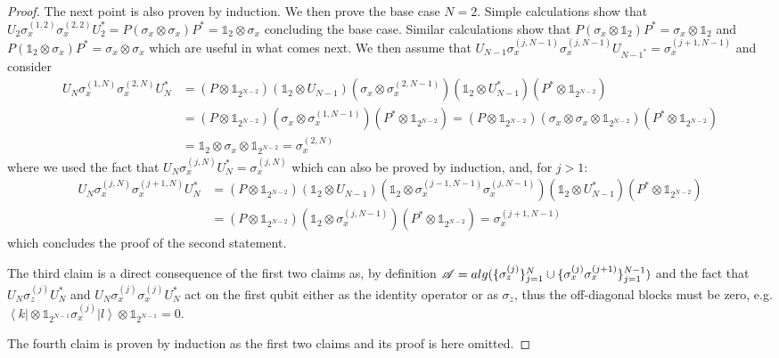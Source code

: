 \documentclass[aihp,12pt]{imsart}
\newcommand{\As}{\mathscr{A}}
\newcommand{\one}{\mathbb{1}}
\newcommand{\alg}{{\rm alg}}
\newcommand{\ket}[1]{\left| #1 \right>}
\newcommand{\bra}[1]{\left< #1 \right|}
\theoremstyle{theorem}
\theoremstyle{definition}
\theoremstyle{remark}
\begin{document}
\begin{proof}
    The next point is also proven by induction. 
    We then prove the base case $N=2$. Simple calculations show that \(U_2\sigma_x^{(1,2)}\sigma_x^{(2,2)} U_2^* = P (\sigma_x\otimes\sigma_x) P^* = \one_2\otimes\sigma_x\) concluding the base case. Similar calculations show that \(P(\sigma_x\otimes\one_2)P^* = \sigma_x\otimes \one_2 \) and \(P(\one_2\otimes\sigma_x)P^* = \sigma_x\otimes \sigma_x \) which are useful in what comes next. We then assume that $U_{N-1} \sigma_x^{(j,N-1)}\sigma_x^{(j,N-1)} U_{N-1^*} = \sigma_x^{(j+1,N-1)}$ and consider
    \begin{align*}
        U_N \sigma_x^{(1,N)}\sigma_x^{(2,N)}U_N^* &= (P\otimes\one_{2^{N-2}})(\one_2\otimes U_{N-1}) (\sigma_x\otimes \sigma_x^{(2,N-1)}) (\one_2\otimes U_{N-1}^*) (P^*\otimes\one_{2^{N-2}})\\
        &= (P\otimes\one_{2^{N-2}}) (\sigma_x\otimes \sigma_x^{(1,N-1)}) (P^*\otimes\one_{2^{N-2}}) = (P\otimes\one_{2^{N-2}}) (\sigma_x\otimes \sigma_x \otimes \one_{2^{N-2}} ) (P^*\otimes\one_{2^{N-2}}) \\&= \one_2\otimes\sigma_x\otimes \one_{2^{N-2}} = \sigma_x^{(2,N)}
    \end{align*}
    where we used the fact that $U_N\sigma_x^{(j,N)}U_N^* = \sigma_x^{(j,N)}$ which can also be proved by induction, and, for $j>1$:
    \begin{align*}
        U_N \sigma_x^{(j,N)}\sigma_x^{(j+1,N)}U_N^* &= (P\otimes\one_{2^{N-2}})(\one_2\otimes U_{N-1}) (\one_2\otimes \sigma_x^{(j-1,N-1)}\sigma_x^{(j,N-1)}) (\one_2\otimes U_{N-1}^*) (P^*\otimes\one_{2^{N-2}})\\
        &= (P\otimes\one_{2^{N-2}})(\one_2\otimes \sigma_x^{(j,N-1)}) (P^*\otimes\one_{2^{N-2}}) = \sigma_x^{(j+1,N-1)}
    \end{align*}
    which concludes the proof of the second statement. 

    The third claim is a direct consequence of the first two claims as, by definition $\As = \alg(\{\sigma_z^{(j)}\}_{j=1}^N\cup\{\sigma_x^{(j)}\sigma_x^{(j+1)}\}_{j=1}^{N-1})$ and the fact that $U_N \sigma_z^{(j)} U_N^*$ and $U_N \sigma_x^{(j)}\sigma_x^{(j)} U_N^*$ act on the first qubit either as the identity operator or as $\sigma_z$, thus the off-diagonal blocks must be zero, e.g. $\bra{k}\otimes\one_{2^{N-1}} \sigma_x^{(j)} \ket{l}\otimes\one_{2^{N-1}} = 0$.

    The fourth claim is proven by induction as the first two claims and its proof is here omitted.
\end{proof}
\end{document}
